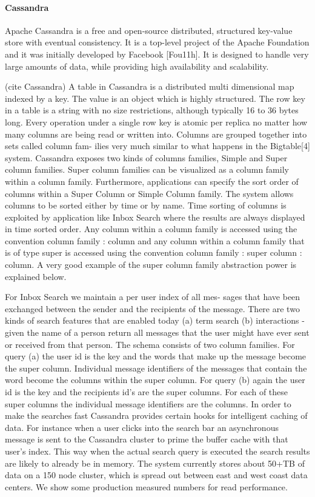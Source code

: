 \paragraph{Cassandra}
Apache Cassandra is a free and open-source distributed, structured key-value store with eventual consistency. It is a top-level project of the Apache Foundation and it was initially developed by Facebook [Fou11h]. It is designed to handle very large amounts of data, while providing high availability and scalability.

(cite Cassandra) A table in Cassandra is a distributed multi dimensional map indexed by a key. The value is an object which is highly structured. The row key in a table is a string with no size restrictions, although typically 16 to 36 bytes long. Every operation under a single row key is atomic per replica no matter how many columns are being read or written into. Columns are grouped together into sets called column fam- ilies very much similar to what happens in the Bigtable[4] system. Cassandra exposes two kinds of columns families, Simple and Super column families. Super column families can be visualized as a column family within a column family.
Furthermore, applications can specify the sort order of columns within a Super Column or Simple Column family. The system allows columns to be sorted either by time or by name. Time sorting of columns is exploited by application like Inbox Search where the results are always displayed in time sorted order. Any column within a column family is accessed using the convention column family : column and any column within a column family that is of type super is accessed using the convention column family : super column : column. A very good example of the super column family abstraction power is explained below.

For Inbox Search we maintain a per user index of all mes- sages that have been exchanged between the sender and the recipients of the message. There are two kinds of search features that are enabled today (a) term search (b) interactions - given the name of a person return all messages that the user might have ever sent or received from that person. The schema consists of two column families. For query (a) the user id is the key and the words that make up the message become the super column. Individual message identifiers of the messages that contain the word become the columns within the super column. For query (b) again the user id is the key and the recipients id's are the super columns. For each of these super columns the individual message identifiers are the columns. In order to make the searches fast Cassandra provides certain hooks for intelligent caching of data. For instance when a user clicks into the search bar an asynchronous message is sent to the Cassandra cluster to prime the buffer cache with that user's index. This way when the actual search query is executed the search results are likely to already be in memory. The system currently stores about 50+TB of data on a 150 node cluster, which is spread out between east and west coast data centers. We show some production measured numbers for read performance.

